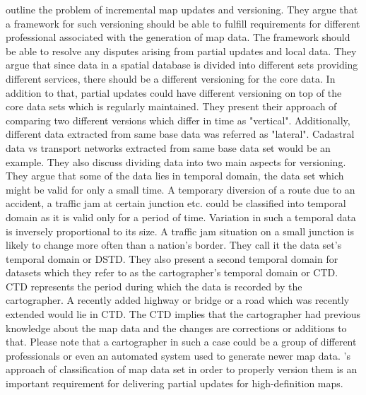 \citet{cooper2001incremental} outline the problem of incremental map updates and versioning. They argue that a framework for such versioning should be able to fulfill requirements for different professional associated with the generation of map data. The framework should be able to resolve any disputes arising from partial updates and local data. They argue that since data in a spatial database is divided into different sets providing different services, there should be a different versioning for the core data. In addition to that, partial updates could have different versioning on top of the core data sets which is regularly maintained. They present their approach of comparing two different versions which differ in time as "vertical". Additionally, different data extracted from same base data was referred as "lateral". Cadastral data vs transport networks extracted from same base data set would be an example. They also discuss dividing data into two main aspects for versioning. They argue that some of the data lies in temporal domain, the data set which might be valid for only a small time. A temporary diversion of a route due to an accident, a traffic jam at certain junction etc. could be classified into temporal domain as it is valid only for a period of time. Variation in such a temporal data is inversely proportional to its size. A traffic jam situation on a small junction is likely to change more often than a nation's border. They call it the data set's temporal domain or DSTD. They also present a second temporal domain for datasets which they refer to as the cartographer's temporal domain or CTD. CTD represents the period during which the data is recorded by the cartographer. A recently added highway or bridge or a road which was recently extended would lie in CTD. The CTD implies that the cartographer had previous knowledge about the map data and the changes are corrections or additions to that. Please note that a cartographer in such a case could be a group of different professionals or even an automated system used to generate newer map data. \cite{cooper2001incremental}'s approach of classification of map data set in order to properly version them is an important requirement for delivering partial updates for high-definition maps. 


